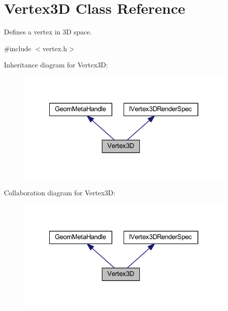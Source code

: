 \hypertarget{class_vertex3_d}{\section{Vertex3\-D Class Reference}
\label{class_vertex3_d}
}


Defines a vertex in 3\-D space.  




{\ttfamily \#include $<$vertex.\-h$>$}



Inheritance diagram for Vertex3\-D\-:
\nopagebreak
\begin{figure}[H]
\begin{center}
\leavevmode
\includegraphics[width=305pt]{class_vertex3_d__inherit__graph}
\end{center}
\end{figure}


Collaboration diagram for Vertex3\-D\-:
\nopagebreak
\begin{figure}[H]
\begin{center}
\leavevmode
\includegraphics[width=305pt]{class_vertex3_d__coll__graph}
\end{center}
\end{figure}
